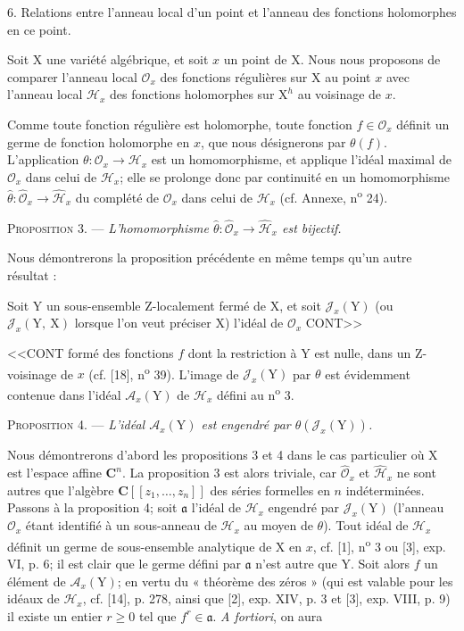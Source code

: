 6. Relations entre l'anneau local d'un point et l'anneau des fonctions holomorphes en ce point.

Soit $\mathrm{X}$ une variété algébrique, et soit $x$ un point de $\mathrm{X}$. Nous nous proposons de comparer l'anneau local $\mathcal{O}_x$ des fonctions régulières sur $\mathrm{X}$ au point $x$ avec l'anneau local $\mathcal{H}_x$ des fonctions holomorphes sur $\mathrm{X}^h$ au voisinage de $x$.

Comme toute fonction régulière est holomorphe, toute fonction $f \in \mathcal{O}_x$ définit un germe de fonction holomorphe en $x$, que nous désignerons par $\theta(f)$. L'application $\theta : \mathcal{O}_x \to \mathcal{H}_x$ est un homomorphisme, et applique l'idéal maximal de $\mathcal{O}_x$ dans celui de $\mathcal{H}_x$; elle se prolonge donc par continuité en un homomorphisme $\hat{\theta} : \hat{\mathcal{O}}_x \to \hat{\mathcal{H}}_x$ du complété de $\mathcal{O}_x$ dans celui de $\mathcal{H}_x$ (cf. Annexe, n\textsuperscript{o} 24).

\textsc{Proposition} 3. --- \textit{L'homomorphisme $\hat{\theta} : \hat{\mathcal{O}}_x \to \hat{\mathcal{H}}_x$ est bijectif.}

Nous démontrerons la proposition précédente en même temps qu'un autre résultat :

Soit $\mathrm{Y}$ un sous-ensemble Z-localement fermé de $\mathrm{X}$, et soit $\mathcal{J}_x(\mathrm{Y})$ (ou $\mathcal{J}_x(\mathrm{Y},\ \mathrm{X})$ lorsque l'on veut préciser $\mathrm{X}$) l'idéal de $\mathcal{O}_x$ CONT>>



<<CONT formé des fonctions $f$ dont la restriction à $\mathrm{Y}$ est nulle, dans un Z-voisinage de $x$ (cf. [18], n\textsuperscript{o} 39). L'image de $\mathcal{J}_x(\mathrm{Y})$ par $\theta$ est évidemment contenue dans l'idéal $\mathcal{A}_x(\mathrm{Y})$ de $\mathcal{H}_x$ défini au n\textsuperscript{o} 3.

\textsc{Proposition} 4. --- \textit{L'idéal $\mathcal{A}_x(\mathrm{Y})$ est engendré par $\theta(\mathcal{J}_x(\mathrm{Y}))$.}

Nous démontrerons d'abord les propositions 3 et 4 dans le cas particulier où $\mathrm{X}$ est l'espace affine $\mathbf{C}^n$. La proposition 3 est alors triviale, car $\hat{\mathcal{O}}_x$ et $\hat{\mathcal{H}}_x$ ne sont autres que l'algèbre $\mathbf{C}[[z_1, \ldots, z_n]]$ des séries formelles en $n$ indéterminées. Passons à la proposition 4; soit $\mathfrak{a}$ l'idéal de $\mathcal{H}_x$ engendré par $\mathcal{J}_x(\mathrm{Y})$ (l'anneau $\mathcal{O}_x$ étant identifié à un sous-anneau de $\mathcal{H}_x$ au moyen de $\theta$). Tout idéal de $\mathcal{H}_x$ définit un germe de sous-ensemble analytique de $\mathrm{X}$ en $x$, cf. [1], n\textsuperscript{o} 3 ou [3], exp. VI, p. 6; il est clair que le germe défini par $\mathfrak{a}$ n'est autre que $\mathrm{Y}$. Soit alors $f$ un élément de $\mathcal{A}_x(\mathrm{Y})$; en vertu du « théorème des zéros » (qui est valable pour les idéaux de $\mathcal{H}_x$, cf. [14], p. 278, ainsi que [2], exp. XIV, p. 3 et [3], exp. VIII, p. 9) il existe un entier $r \geqslant 0$ tel que $f^r \in \mathfrak{a}$. \textit{A fortiori}, on aura

